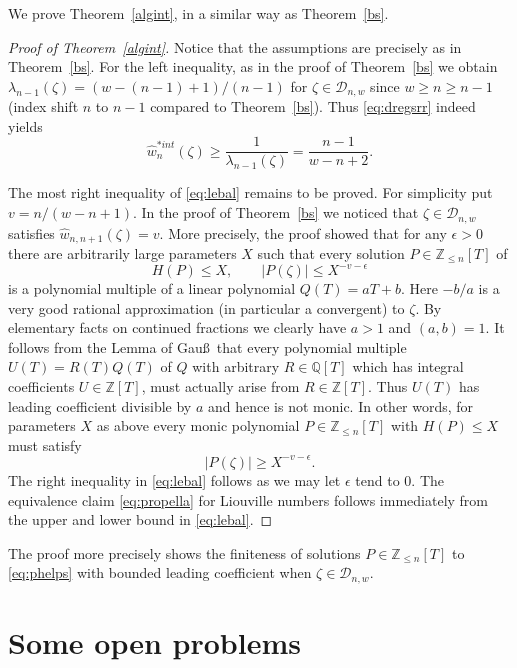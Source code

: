 \documentclass[12pt]{amsart}
\theoremstyle{definition}
\begin{document}
We prove Theorem~\ref{algint}, 
in a similar way as Theorem~\ref{bs}.

\begin{proof}[Proof of Theorem~\ref{algint}]
Notice that the assumptions are precisely as in Theorem~\ref{bs}. For
the left inequality, as in the proof of Theorem~\ref{bs} we obtain
$\lambda_{n-1}(\zeta)=(w-(n-1)+1)/(n-1)$ for 
$\zeta\in\mathscr{D}_{n,w}$ 
since $w\geq n \geq n-1$ (index shift $n$ to $n-1$ compared 
to Theorem~\ref{bs}). 
Thus \eqref{eq:dregsrr} indeed yields
%
\[
\widehat{w}_{n}^{\ast int}(\zeta) \geq \frac{1}{\lambda_{n-1}(\zeta)}= \frac{n-1}{w-n+2}.
\]
%

The most right inequality of \eqref{eq:lebal} remains to be proved.
For simplicity put $v=n/(w-n+1)$.
In the proof of Theorem~\ref{bs} we noticed that 
$\zeta\in\mathscr{D}_{n,w}$ satisfies $\widehat{w}_{n,n+1}(\zeta)=v$.
More precisely, the proof showed that for any $\epsilon>0$ there are arbitrarily large parameters
$X$ such that every solution $P\in \mathbb{Z}_{\leq n}[T]$ of 
%
\begin{equation} \label{eq:phelps}
H(P)\leq X, \qquad \vert P(\zeta)\vert \leq X^{-v-\epsilon}
\end{equation}
%
is a polynomial multiple of a linear polynomial $Q(T)=aT+b$.
Here $-b/a$ is a very good rational approximation (in particular a convergent) to $\zeta$. 
By elementary facts on continued fractions we clearly have $a>1$ 
and $(a,b)=1$. 
It follows from the Lemma of Gau\ss\
that every polynomial multiple $U(T)=R(T)Q(T)$ of $Q$ with arbitrary 
$R\in\mathbb{Q}[T]$ which has integral coefficients
$U\in\mathbb{Z}[T]$, must actually arise from $R\in\mathbb{Z}[T]$. Thus $U(T)$ has 
leading coefficient divisible by $a$ and hence is not monic. 
In other words, for parameters $X$ as above every monic polynomial 
$P\in \mathbb{Z}_{\leq n}[T]$ with $H(P)\leq X$ must satisfy
%
\[
\vert P(\zeta)\vert \geq X^{-v-\epsilon}.
\]
%
The right inequality in \eqref{eq:lebal} follows as we may let $\epsilon$ tend to $0$.
The equivalence claim \eqref{eq:propella}
for Liouville numbers follows immediately 
from the upper and lower bound in \eqref{eq:lebal}.
\end{proof}

The proof more precisely shows the finiteness of solutions 
$P\in\mathbb{Z}_{\leq n}[T]$ to \eqref{eq:phelps} with bounded leading coefficient when $\zeta\in\mathscr{D}_{n,w}$. 





\section{Some open problems}  \label{openp}
\end{document}
